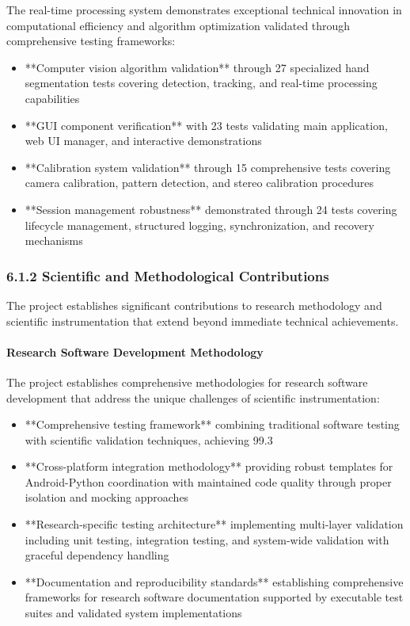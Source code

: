 \documentclass[11pt,a4paper]{article}
\begin{document}
The real-time processing system demonstrates exceptional technical innovation in computational efficiency and algorithm
optimization validated through comprehensive testing frameworks:

\begin{itemize}
\item **Computer vision algorithm validation** through 27 specialized hand segmentation tests covering detection,
  tracking, and real-time processing capabilities
\item **GUI component verification** with 23 tests validating main application, web UI manager, and interactive
  demonstrations
\item **Calibration system validation** through 15 comprehensive tests covering camera calibration, pattern detection,
  and stereo calibration procedures
\item **Session management robustness** demonstrated through 24 tests covering lifecycle management, structured logging,
  synchronization, and recovery mechanisms

\end{itemize}
\subsubsection{6.1.2 Scientific and Methodological Contributions}

The project establishes significant contributions to research methodology and scientific instrumentation that extend
beyond immediate technical achievements.

\paragraph{Research Software Development Methodology}

The project establishes comprehensive methodologies for research software development that address the unique challenges
of scientific instrumentation:

\begin{itemize}
\item **Comprehensive testing framework** combining traditional software testing with scientific validation techniques,
  achieving 99.3%
\item **Cross-platform integration methodology** providing robust templates for Android-Python coordination with
  maintained code quality through proper isolation and mocking approaches
\item **Research-specific testing architecture** implementing multi-layer validation including unit testing,
  integration testing, and system-wide validation with graceful dependency handling
\item **Documentation and reproducibility standards** establishing comprehensive frameworks for research software
  documentation supported by executable test suites and validated system implementations

\end{itemize}
\end{document}
